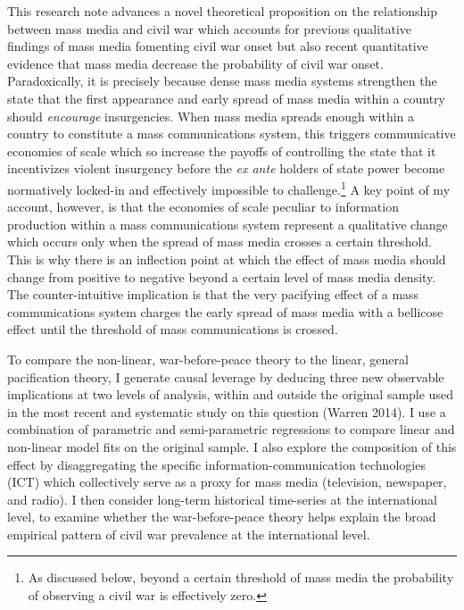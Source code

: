\documentclass[11pt,article,oneside]{memoir}
\begin{document}
This research note advances a novel theoretical proposition on the
relationship between mass media and civil war which accounts for
previous qualitative findings of mass media fomenting civil war onset
but also recent quantitative evidence that mass media decrease the
probability of civil war onset. Paradoxically, it is precisely because
dense mass media systems strengthen the state that the first appearance
and early spread of mass media within a country should \emph{encourage}
insurgencies. When mass media spreads enough within a country to
constitute a mass communications system, this triggers communicative
economies of scale which so increase the payoffs of controlling the
state that it incentivizes violent insurgency before the \emph{ex ante}
holders of state power become normatively locked-in and effectively
impossible to challenge.\footnote{As discussed below, beyond a certain
  threshold of mass media the probability of observing a civil war is
  effectively zero.} A key point of my account, however, is that the
economies of scale peculiar to information production within a mass
communications system represent a qualitative change which occurs only
when the spread of mass media crosses a certain threshold. This is why
there is an inflection point at which the effect of mass media should
change from positive to negative beyond a certain level of mass media
density. The counter-intuitive implication is that the very pacifying
effect of a mass communications system charges the early spread of mass
media with a bellicose effect until the threshold of mass communications
is crossed.

To compare the non-linear, war-before-peace theory to the linear,
general pacification theory, I generate causal leverage by deducing
three new observable implications at two levels of analysis, within and
outside the original sample used in the most recent and systematic study
on this question (Warren 2014). I use a combination of parametric and
semi-parametric regressions to compare linear and non-linear model fits
on the original sample. I also explore the composition of this effect by
disaggregating the specific information-communication technologies (ICT)
which collectively serve as a proxy for mass media (television,
newspaper, and radio). I then consider long-term historical time-series
at the international level, to examine whether the war-before-peace
theory helps explain the broad empirical pattern of civil war prevalence
at the international level.
\end{document}
